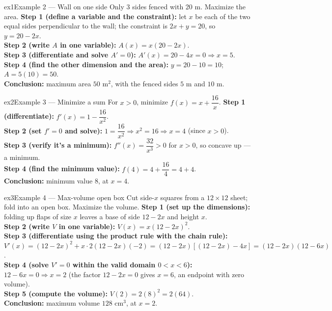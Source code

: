 \documentclass[11pt]{article}
\begin{document}
\begin{example}{ex1}{Example 2 --- Wall on one side}
Only 3 sides fenced with 20 m. Maximize the area.\soln
\textbf{Step 1 (define a variable and the constraint):} let $x$ be each of the two equal sides perpendicular to the wall; the constraint is $2x+y=20$, so $y=20-2x$.\\[3pt]
\textbf{Step 2 (write $A$ in one variable):} $A(x)=x(20-2x)$.\\[3pt]
\textbf{Step 3 (differentiate and solve $A'=0$):} $A'(x)=20-4x=0\Rightarrow x=5$.\\[3pt]
\textbf{Step 4 (find the other dimension and the area):} $y=20-10=10$; $A=5(10)=50$.\\[3pt]
\textbf{Conclusion:} maximum area $50$ m$^2$, with the fenced sides $5$ m and $10$ m.
\end{example}

\begin{example}{ex2}{Example 3 --- Minimize a sum}
For $x>0$, minimize $f(x)=x+\dfrac{16}{x}$.\soln
\textbf{Step 1 (differentiate):} $f'(x)=1-\dfrac{16}{x^2}$.\\[3pt]
\textbf{Step 2 (set $f'=0$ and solve):} $1=\dfrac{16}{x^2}\Rightarrow x^2=16\Rightarrow x=4$ (since $x>0$).\\[3pt]
\textbf{Step 3 (verify it's a minimum):} $f''(x)=\dfrac{32}{x^3}>0$ for $x>0$, so concave up --- a minimum.\\[3pt]
\textbf{Step 4 (find the minimum value):} $f(4)=4+\dfrac{16}{4}=4+4$.\\[3pt]
\textbf{Conclusion:} minimum value $8$, at $x=4$.
\end{example}

\begin{example}{ex3}{Example 4 --- Max-volume open box}
Cut side-$x$ squares from a $12\times12$ sheet; fold into an open box. Maximize the volume.\soln
\textbf{Step 1 (set up the dimensions):} folding up flaps of size $x$ leaves a base of side $12-2x$ and height $x$.\\[3pt]
\textbf{Step 2 (write $V$ in one variable):} $V(x)=x(12-2x)^2$.\\[3pt]
\textbf{Step 3 (differentiate using the product rule with the chain rule):} $V'(x)=(12-2x)^2+x\cdot2(12-2x)(-2)=(12-2x)[(12-2x)-4x]=(12-2x)(12-6x)$.\\[3pt]
\textbf{Step 4 (solve $V'=0$ within the valid domain $0<x<6$):} $12-6x=0\Rightarrow x=2$ (the factor $12-2x=0$ gives $x=6$, an endpoint with zero volume).\\[3pt]
\textbf{Step 5 (compute the volume):} $V(2)=2(8)^2=2(64)$.\\[3pt]
\textbf{Conclusion:} maximum volume $128$ cm$^3$, at $x=2$.
\end{example}
\end{document}

